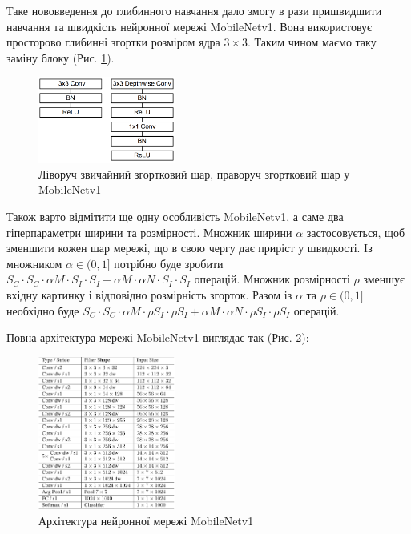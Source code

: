 Таке нововведення до глибинного навчання дало змогу в рази пришвидшити
навчання та швидкість нейронної мережі MobileNetv1. Вона використовує
просторово глибинні згортки розміром ядра $3 \times 3$.
Таким чином маємо таку заміну блоку (Рис. \ref{fig:cnn:mobilenetv1_conv_layer}).

\begin{figure}[H]
    \centering
    \includegraphics[width=0.4\textwidth]{images/cnn_mobilenetv1_conv_layer}
    \caption{Ліворуч звичайний згортковий шар,
        праворуч згортковий шар у MobileNetv1  \cite{mobilenetv1}
        \label{fig:cnn:mobilenetv1_conv_layer}
    }
\end{figure}

Також варто відмітити ще одну особливість MobileNetv1, а саме два гіперпараметри
ширини та розмірності.
Множник ширини $\alpha$ застосовується, щоб зменшити кожен шар мережі, що
в свою чергу дає приріст у швидкості.
Iз множником  $\alpha \in (0,1]$ потрібно буде зробити
$S_C · S_C · \alpha M · S_I · S_I + \alpha M · \alpha N · S_I · S_I$ операцій.
Множник розмірності $\rho$ зменшує вхідну картинку і відповідно
розмірність згорток. Разом із $\alpha$  та $\rho \in (0,1]$ необхідно буде
$S_C · S_C · \alpha M · \rho S_I · \rho S_I + \alpha M ·\alpha  N · \rho S_I · \rho S_I$
операцій.

Повна архітектура мережі MobileNetv1 виглядає так (Рис. \ref{fig:cnn:mobilenetv1_architecture}):

\begin{figure}[H]
    \centering
    \includegraphics[width=0.4\textwidth]{images/cnn_mobilenetv1_architecture}
    \caption{Архітектура нейронної мережі MobileNetv1   \cite{mobilenetv1}
        \label{fig:cnn:mobilenetv1_architecture}
    }
\end{figure}


